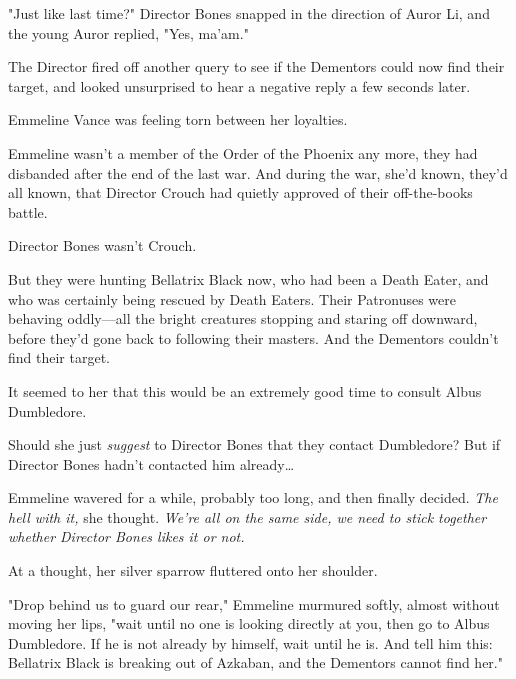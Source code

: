 "Just like last time?" Director Bones snapped in the direction of Auror Li, and
the young Auror replied, "Yes, ma'am."

The Director fired off another query to see if the Dementors could now find
their target, and looked unsurprised to hear a negative reply a few seconds
later.

Emmeline Vance was feeling torn between her loyalties.

Emmeline wasn't a member of the Order of the Phoenix any more, they had
disbanded after the end of the last war. And during the war, she'd known,
they'd all known, that Director Crouch had quietly approved of their
off-the-books battle.

Director Bones wasn't Crouch.

But they were hunting Bellatrix Black now, who had been a Death Eater, and who
was certainly being rescued by Death Eaters. Their Patronuses were behaving
oddly—all the bright creatures stopping and staring off downward, before
they'd gone back to following their masters. And the Dementors couldn't find
their target.

It seemed to her that this would be an extremely good time to consult Albus
Dumbledore.

Should she just \emph{suggest} to Director Bones that they contact Dumbledore?
But if Director Bones hadn't contacted him already…

Emmeline wavered for a while, probably too long, and then finally decided.
\emph{The hell with it,} she thought. \emph{We're all on the same side, we need
to stick together whether Director Bones likes it or not.}

At a thought, her silver sparrow fluttered onto her shoulder.

"Drop behind us to guard our rear," Emmeline murmured softly, almost without
moving her lips, "wait until no one is looking directly at you, then go to
Albus Dumbledore. If he is not already by himself, wait until he is. And tell
him this: Bellatrix Black is breaking out of Azkaban, and the Dementors cannot
find her."
